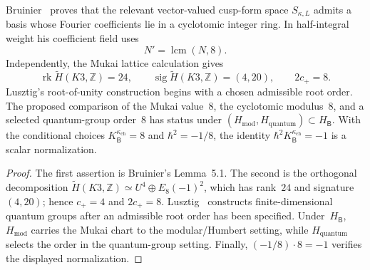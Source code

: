 \begin{proposition}
\label{prop:canonical-bruinier-heegner-chern}
Bruinier~\cite[Lemma~5.1]{Bruinier2002} proves that the relevant
vector-valued cusp-form space $S_{\kappa,L}$ admits a basis whose
Fourier coefficients lie in a cyclotomic integer ring.  In
half-integral weight his coefficient field uses
\[
 N'=\operatorname{lcm}(N,8).
\]
Independently, the Mukai lattice calculation gives
\[
 \operatorname{rk}\widetilde H(K3,\mathbb Z)=24,
 \qquad
 \operatorname{sig}\widetilde H(K3,\mathbb Z)=(4,20),
 \qquad
 2c_+=8.
\]
Lusztig's root-of-unity construction begins with a chosen admissible
root order.  The proposed comparison of the Mukai value~$8$, the
cyclotomic modulus~$8$, and a selected quantum-group order~$8$ has
status \ClaimStatusConjectured under
$(H_{\mathrm{mod}},H_{\mathrm{quantum}})\subset H_{\mathsf B}$.
With the conditional choices
$K^{\kappa_{\mathrm{ch}}}_{\mathsf B}=8$ and $\hbar^2=-1/8$, the
identity $\hbar^2K^{\kappa_{\mathrm{ch}}}_{\mathsf B}=-1$ is a scalar
normalization.
\end{proposition}

\begin{proof}
The first assertion is Bruinier's Lemma~5.1.  The second is the
orthogonal decomposition
$\widetilde H(K3,\mathbb Z)\simeq U^4\oplus E_8(-1)^2$, which has
rank~$24$ and signature~$(4,20)$; hence $c_+=4$ and $2c_+=8$.
Lusztig~\cite{Lusztig90} constructs finite-dimensional quantum groups
after an admissible root order has been specified.  Under~$H_{\mathsf B}$,
$H_{\mathrm{mod}}$ carries the Mukai chart to the modular/Humbert
setting, while $H_{\mathrm{quantum}}$ selects the order in the
quantum-group setting.  Finally,
$(-1/8)\cdot8=-1$ verifies the displayed normalization.
\end{proof}

